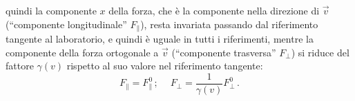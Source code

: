 quindi la componente $x$ della forza, che \`e la componente nella direzione di
$\vec v$ (``componente longitudinale'' $F_\parallel$), resta invariata passando
dal riferimento tangente al laboratorio, e quindi \`e uguale in tutti i
riferimenti, mentre la componente della forza ortogonale a $\vec v$
(``componente trasversa'' $F_\perp$) si riduce del fattore $\gamma(v)$ rispetto
al suo valore nel riferimento tangente:
\begin{equation}
  F_\parallel=F_\parallel^0\,;\quad\ F_\perp=\frac{1}{\gamma(v)}F_\perp^0\,.
  \tag{5.36}
\end{equation}
